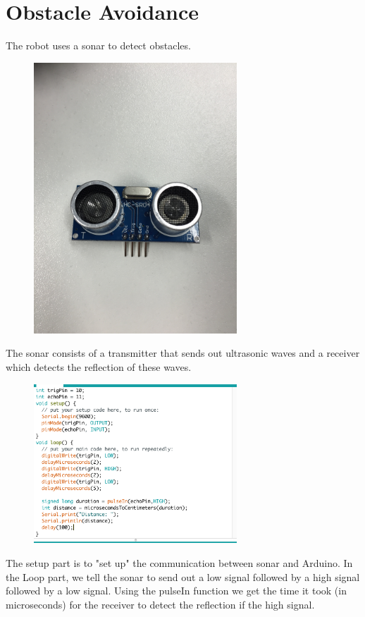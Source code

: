 \documentclass[final,3p,times,twocolumn]{elsarticle}
\begin{document}
\section{Obstacle Avoidance}
The robot uses a sonar to detect obstacles. 
\begin{figure}[h!]
\includegraphics[trim={14cm 30cm 14cm 50cm}, clip, width=3in]{./media/Sonar.jpg}
\end{figure}
The sonar consists of a transmitter that sends out ultrasonic waves and a receiver which detects the reflection of these waves.
\begin{figure}[h!]
\includegraphics[trim={0cm 0cm 0cm 0cm}, clip, width=3in]{./media/sonarCode.jpg}
\end{figure}
The setup part is to "set up" the communication between sonar and Arduino.
In the Loop part, we tell the sonar to send out a low signal followed by a high signal followed by a low signal.
Using the pulseIn function we get the time it took (in microseconds) for the receiver to detect the reflection if the high signal.
\end{document}
